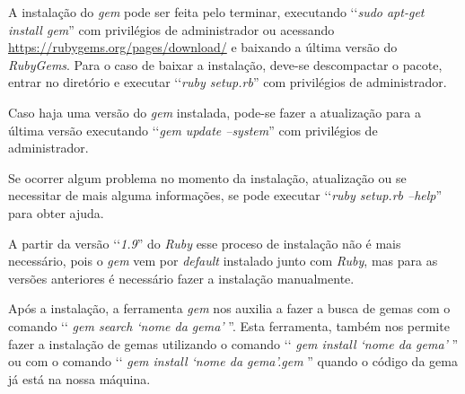A instalação do \emph{gem} pode ser feita pelo terminar, executando ‘‘\emph{sudo apt-get install gem}'' com
privilégios de administrador ou acessando \url{https://rubygems.org/pages/download/} e baixando a última
versão do \emph{RubyGems}. Para o caso de baixar a instalação, deve-se descompactar o pacote, entrar
no diretório e executar ‘‘\emph{ruby setup.rb}'' com privilégios de administrador.

Caso haja uma versão do \emph{gem} instalada, pode-se fazer a atualização para a última versão executando
‘‘\emph{gem update --system}'' com privilégios de administrador.

Se ocorrer algum problema no momento da instalação, atualização ou se necessitar de mais
alguma informações, se pode executar ‘‘\emph{ruby setup.rb --help}'' para obter ajuda.

A partir da versão ‘‘\emph{1.9}'' do \emph{Ruby} esse proceso de instalação não é mais necessário, pois o
\emph{gem} vem por \emph{default} instalado junto com \emph{Ruby}, mas para as versões anteriores
é necessário fazer a instalação manualmente.

Após a instalação, a ferramenta \emph{gem} nos auxilia a fazer a busca de gemas com o comando
‘‘ \emph{gem search ‘nome da gema' }''. Esta ferramenta, também nos permite fazer a instalação de
gemas utilizando o comando ‘‘ \emph{gem install ‘nome da gema' }'' ou com o comando
‘‘ \emph{gem install ‘nome da gema'.gem }'' quando o código da gema já está na nossa máquina.